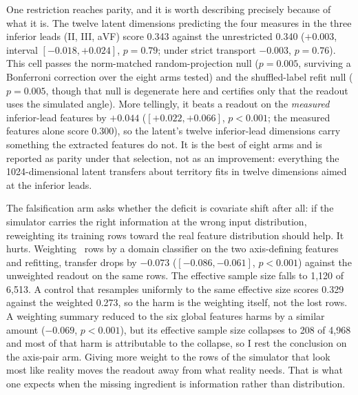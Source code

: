 One restriction reaches parity, and it is worth describing precisely because of what it is. The twelve latent dimensions predicting the four measures in the three inferior leads (II, III, aVF) score 0.343 against the unrestricted 0.340 ($+0.003$, interval $[-0.018, +0.024]$, $p=0.79$; under strict transport $-0.003$, $p=0.76$). This cell passes the norm-matched random-projection null ($p=0.005$, surviving a Bonferroni correction over the eight arms tested) and the shuffled-label refit null ($p=0.005$, though that null is degenerate here and certifies only that the readout uses the simulated angle). More tellingly, it beats a readout on the \emph{measured} inferior-lead features by $+0.044$ ($[+0.022, +0.066]$, $p<0.001$; the measured features alone score 0.300), so the latent's twelve inferior-lead dimensions carry something the extracted features do not. It is the best of eight arms and is reported as parity under that selection, not as an improvement: everything the 1024-dimensional latent transfers about territory fits in twelve dimensions aimed at the inferior leads. 

The falsification arm asks whether the deficit is covariate shift after all: if the simulator carries the right information at the wrong input distribution, reweighting its training rows toward the real feature distribution should help. It hurts. Weighting \medalcare\ rows by a domain classifier on the two axis-defining features and refitting, transfer drops by $-0.073$ ($[-0.086, -0.061]$, $p<0.001$) against the unweighted readout on the same rows. The effective sample size falls to 1,120 of 6,513. A control that resamples uniformly to the same effective size scores 0.329 against the weighted 0.273, so the harm is the weighting itself, not the lost rows. A weighting summary reduced to the six global features harms by a similar amount ($-0.069$, $p<0.001$), but its effective sample size collapses to 208 of 4,968 and most of that harm is attributable to the collapse, so I rest the conclusion on the axis-pair arm. Giving more weight to the rows of the simulator that look most like reality moves the readout away from what reality needs. That is what one expects when the missing ingredient is information rather than distribution. 

